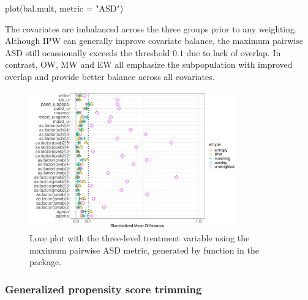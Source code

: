 \begin{example}
plot(bal.mult, metric = "ASD")
\end{example}


The covariates are imbalanced across the three groups prior to any weighting. Although IPW can generally improve covariate balance, the maximum pairwise ASD still ocassionally exceeds the threshold $0.1$ due to lack of overlap. In contrast, OW, MW and EW all emphasize the subpopulation with improved overlap and provide better balance across all covariates. 

\begin{figure}[htbp]
\centering
\includegraphics[width=0.8\textwidth]{figure/multasd.pdf}
\caption{Love plot with the three-level treatment variable  using the maximum pairwise ASD metric, generated by  function in the  package.}\label{fig:multasd}
\end{figure}

\subsubsection{Generalized propensity score trimming}

